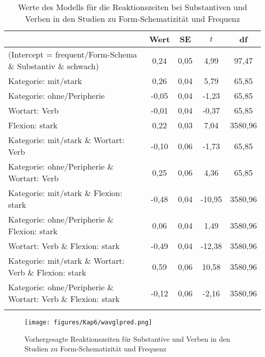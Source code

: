 \begin{table}
\begin{tabularx}{\textwidth}{Q S[table-format=-1.2] S[table-format=1.2] S[table-format=-2.2] S[table-format=4.2]}
\lsptoprule
& {Wert} & {SE} & {$t$} & {df}\\ \midrule
(Intercept = frequent/Form-Schema \& Substantiv \& schwach) & 0,24 & 0,05 & 4,99 & 97,47 \\ 
Kategorie: mit/stark & 0,26 & 0,04 & 5,79 & 65,85 \\ 
Kategorie: ohne/Peripherie & -0,05 & 0,04 & -1,23 & 65,85 \\ 
Wortart: Verb & -0,01 & 0,04 & -0,37 & 65,85 \\ 
Flexion: stark & 0,22 & 0,03 & 7,04 & 3580,96 \\ 
Kategorie: mit/stark \& Wortart: Verb & -0,10 & 0,06 & -1,73 & 65,85 \\ 
Kategorie: ohne/Peripherie \& Wortart: Verb & 0,25 & 0,06 & 4,36 & 65,85 \\ 
Kategorie: mit/stark \& Flexion: stark & -0,48 & 0,04 & -10,95 & 3580,96 \\ 
Kategorie: ohne/Peripherie \& Flexion: stark & 0,06 & 0,04 & 1,49 & 3580,96 \\ 
Wortart: Verb \& Flexion: stark & -0,49 & 0,04 & -12,38 & 3580,96 \\ 
Kategorie: mit/stark \& Wortart: Verb \& Flexion: stark & 0,59 & 0,06 & 10,58 & 3580,96 \\ 
Kategorie: ohne/Peripherie \& Wortart: Verb \& Flexion: stark & -0,12 & 0,06 & -2,16 & 3580,96 \\
\lspbottomrule
\end{tabularx}
\caption{Werte des Modells für die Reaktionszeiten bei Substantiven und Verben in den Studien zu Form-Sche\-ma\-ti\-zi\-tät und Frequenz}
\label{vglwamodell}
\end{table}

\begin{figure}
\texttt{[image: figures/Kap6/wavglpred.png]} 
\caption{Vorhergesagte Reaktionszeiten für Substantive und Verben in den Studien zu Form-Schematizität und Frequenz}
\label{wavglpred}
\end{figure}

